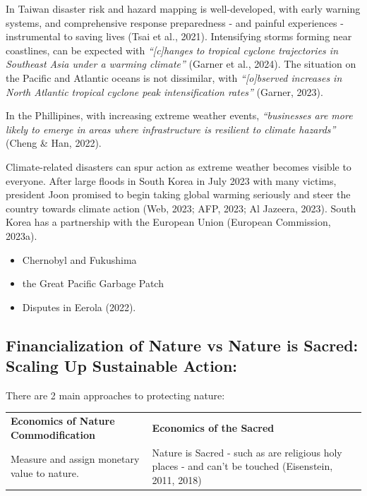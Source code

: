 \documentclass[
  letterpaper,
  DIV=11,
  numbers=noendperiod]{scrartcl}
\providecommand{\tightlist}{%
  \setlength{\itemsep}{0pt}\setlength{\parskip}{0pt}}\usepackage{longtable,booktabs,array}
\begin{document}
In Taiwan disaster risk and hazard mapping is well-developed, with early
warning systems, and comprehensive response preparedness - and painful
experiences - instrumental to saving lives (Tsai et al., 2021).
Intensifying storms forming near coastlines, can be expected with
\emph{``{[}c{]}hanges to tropical cyclone trajectories in Southeast Asia
under a warming climate''} (Garner et al., 2024). The situation on the
Pacific and Atlantic oceans is not dissimilar, with
\emph{``{[}o{]}bserved increases in North Atlantic tropical cyclone peak
intensification rates''} (Garner, 2023).

In the Phillipines, with increasing extreme weather events,
\emph{``businesses are more likely to emerge in areas where
infrastructure is resilient to climate hazards''} (Cheng \& Han, 2022).

Climate-related disasters can spur action as extreme weather becomes
visible to everyone. After large floods in South Korea in July 2023 with
many victims, president Joon promised to begin taking global warming
seriously and steer the country towards climate action (Web, 2023; AFP,
2023; Al Jazeera, 2023). South Korea has a partnership with the European
Union (European Commission, 2023a).

\begin{itemize}
\tightlist
\item
  Chernobyl and Fukushima
\item
  the Great Pacific Garbage Patch
\item
  Disputes in Eerola (2022).
\end{itemize}

\subsection{Financialization of Nature vs Nature is Sacred: Scaling Up
Sustainable
Action:}\label{financialization-of-nature-vs-nature-is-sacred-scaling-up-sustainable-action}

There are 2 main approaches to protecting nature:

\begin{longtable}[]{@{}
  >{\raggedright\arraybackslash}p{}
  >{\raggedright\arraybackslash}p{}@{}}
\toprule\noalign{}
\endhead
\bottomrule\noalign{}
\endlastfoot
\textbf{Economics of Nature Commodification} & \textbf{Economics of the
Sacred} \\
Measure and assign monetary value to nature. & Nature is Sacred - such
as are religious holy places - and can't be touched (Eisenstein, 2011,
2018) \\
\end{longtable}
\end{document}
